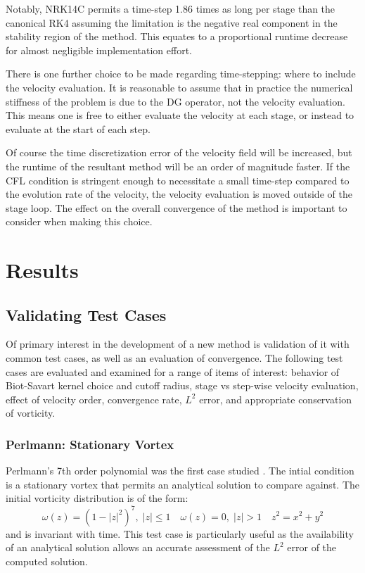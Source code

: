 \documentclass[letterpaper,12pt]{report}
\newcommand{\be}{\begin{equation}}
\newcommand{\ee}{\end{equation}}
\begin{document}
Notably, NRK14C permits a time-step 1.86 times as long per stage than the canonical RK4 assuming the limitation is the negative real component in the stability region of the method. This equates to a proportional runtime decrease for almost negligible implementation effort. 

There is one further choice to be made regarding time-stepping: where to include the velocity evaluation. It is reasonable to assume that in practice the numerical stiffness of the problem is due to the DG operator, not the velocity evaluation. This means one is free to either evaluate the velocity at each stage, or instead to evaluate at the start of each step. 

Of course the time discretization error of the velocity field will be increased, but the runtime of the resultant method will be an order of magnitude faster. If the CFL condition is stringent enough to necessitate a small time-step compared to the evolution rate of the velocity, the velocity evaluation is moved outside of the stage loop. The effect on the overall convergence of the method is important to consider when making this choice.

\chapter{Results}
\section{Validating Test Cases}
Of primary interest in the development of a new method is validation of it with common test cases, as well as an evaluation of convergence. The following test cases are evaluated and examined for a range of items of interest: behavior of Biot-Savart kernel choice and cutoff radius, stage vs step-wise velocity evaluation, effect of velocity order, convergence rate, $L^2$ error, and appropriate conservation of vorticity.

\subsection{Perlmann: Stationary Vortex}
Perlmann's 7th order polynomial was the first case studied \cite{Perlmann1985}. The intial condition is a stationary vortex that permits an analytical solution to compare against. The initial vorticity distribution is of the form:
\be \omega(z)=(1-|z|^2)^7, \; |z|\leq 1  \quad \omega(z)=0, \;|z|>1 \quad z^2=x^2+y^2 \ee
and is invariant with time. This test case is particularly useful as the availability of an analytical solution allows an accurate assessment of the $L^2$ error of the computed solution.
\end{document}
